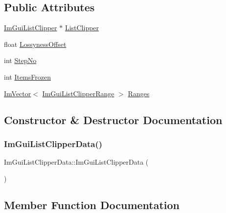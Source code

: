 \subsection*{Public Attributes}
\begin{DoxyCompactItemize}
\item 
\hyperlink{structImGuiListClipper}{Im\+Gui\+List\+Clipper} $\ast$ \hyperlink{structImGuiListClipperData_aeb787db0ff6a9e2e784a4d511b8f8728}{List\+Clipper}
\item 
float \hyperlink{structImGuiListClipperData_a34eda33d4bf1e848709b0360fe4e743f}{Lossyness\+Offset}
\item 
int \hyperlink{structImGuiListClipperData_a6751b323ebd8a24488d8745a3551079f}{Step\+No}
\item 
int \hyperlink{structImGuiListClipperData_ad12218579f16b91051aac83d84b3a7fe}{Items\+Frozen}
\item 
\hyperlink{structImVector}{Im\+Vector}$<$ \hyperlink{structImGuiListClipperRange}{Im\+Gui\+List\+Clipper\+Range} $>$ \hyperlink{structImGuiListClipperData_ab0960f6b46ef337c649db08bb73b3fd2}{Ranges}
\end{DoxyCompactItemize}


\subsection{Constructor \& Destructor Documentation}
\mbox{\label{structImGuiListClipperData_a05ce3a593cc4a9530fce8c89804cee5d}} 
\subsubsection{\texorpdfstring{Im\+Gui\+List\+Clipper\+Data()}{ImGuiListClipperData()}}
{\footnotesize\ttfamily Im\+Gui\+List\+Clipper\+Data\+::\+Im\+Gui\+List\+Clipper\+Data (\begin{DoxyParamCaption}{ }\end{DoxyParamCaption})\hspace{0.3cm}{\ttfamily [inline]}}



\subsection{Member Function Documentation}
\mbox{\label{structImGuiListClipperData_a2fd1f3adb3fda313acddc1203fec0d1c}} 

